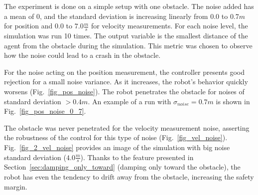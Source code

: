 The experiment is done on a simple setup with one obstacle. The noise added has a mean of $0$, and the standard deviation is increasing linearly from $0.0$ to $0.7m$ for position and $0.0$ to $7.0 \frac{m}{s}$ for velocity measurements. For each noise level, the simulation was run 10 times. The output variable is the smallest distance of the agent from the obstacle during the simulation. This metric was chosen to observe how the noise could lead to a crash in the obstacle. 

For the noise acting on the position measurement, the controller presents good rejection for a small noise variance. As it increases, the robot's behavior quickly worsens (Fig.~\ref{fig_pos_noise}). The robot penetrates the obstacle for noises of standard deviation $ > 0.4 m$. An example of a run with $\sigma_{noise} = 0.7 m$ is shown in Fig.~\ref{fig_pos_noise_0_7}.

The obstacle was never penetrated for the velocity measurement noise, asserting the robustness of the control for this type of noise (Fig.~\ref{fig_vel_noise}). Fig.~\ref{fig_2_vel_noise} provides an image of the simulation with big noise standard deviation ($4.0 \frac{m}{s}$). Thanks to the feature presented in Section~\ref{sec:damping_only_toward} (damping only toward the obstacle), the robot has even the tendency to drift away from the obstacle, increasing the safety margin.



